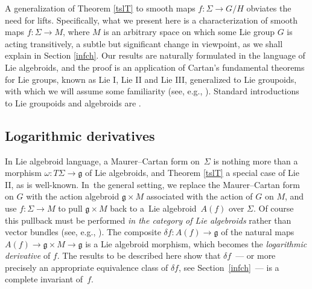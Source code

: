 \documentclass[10pt,a4paper]{amsart}
\numberwithin{equation}{section}
\begin{document}
A generalization of Theorem \ref{tslT} to smooth maps $f \colon \Sigma
\rightarrow G/H$ obviates the need for lifts. Specifically, what we
present here is a characterization of smooth maps $f \colon \Sigma
\rightarrow M$, where $M$ is an arbitrary space on which some Lie
group $G$ is acting transitively, a subtle but significant change in
viewpoint, as we shall explain in Section \ref{infch}. Our results are
naturally formulated in the language of Lie algebroids, and the proof
is an application of Cartan's fundamental theorems for Lie groups,
known as Lie I, Lie II and Lie III, generalized to Lie groupoids, with
which we will assume some familiarity (see, e.g.,
\cite{Crainic_Fernandes_03,Crainic_Fernandes_11}). Standard
introductions to Lie groupoids and algebroids are
\cite{CannasdaSilva_Weinstein_99,Crainic_Fernandes_11,Dufour_Nguyen_05,Mackenzie_05}.


\subsection*{Logarithmic derivatives}

In Lie algebroid language, a Maurer--Cartan form on~$\Sigma $ is
nothing more than a morphism
$\omega \colon {T \Sigma } \rightarrow {\mathfrak g}$ of Lie
algebroids, and Theorem \ref{tslT} a special case of Lie II, as is
well-known. In~the general setting, we replace the Maurer--Cartan form
on $G$ with the action algebroid ${\mathfrak g} \times M$ asso\-ci\-a\-ted
with the action of $G$ on $M$, and use $f \colon \Sigma \rightarrow M$
to pull ${\mathfrak g} \times M$ back to a~Lie algebroid~$A(f)$ over
$\Sigma $. Of course this pullback must be performed {\em in the
 category of Lie algebroids} rather than vector bundles (see, e.g.,
\cite[Section~4.2]{Mackenzie_05}). The composite
$ \delta f \colon A(f) \rightarrow {\mathfrak g}$ of the natural maps
$A(f) \rightarrow {\mathfrak g} \times M \rightarrow {\mathfrak g} $
is a Lie algebroid morphism, which becomes the {\it logarithmic
 derivative} of $f$. The results to be described here show that
$\delta f$~--- or more precisely an appropriate equivalence class of
$\delta f$, see Section~\ref{infch}~--- is a complete invariant of~$f$.
\end{document}
